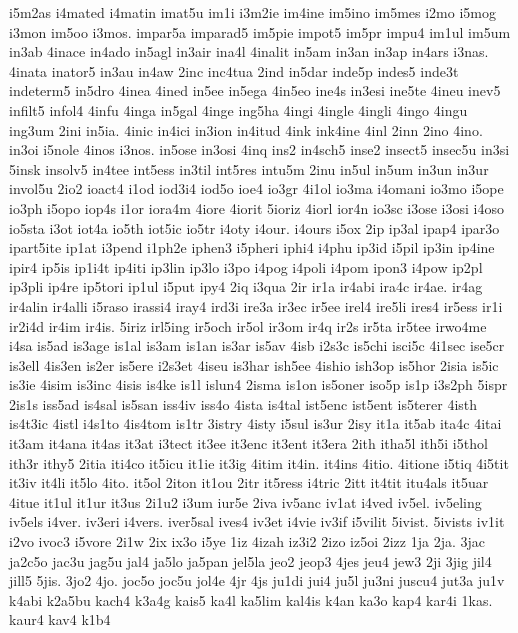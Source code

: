 {i5m2as
i4mated
i4matin
imat5u
im1i
i3m2ie
im4ine
im5ino
im5mes
i2mo
i5mog
i3mon
im5oo
i3mos.
impar5a
imparad5
im5pie
impot5
im5pr
impu4
im1ul
im5um
in3ab
4inace
in4ado
in5agl
in3air
ina4l
4inalit
in5am
in3an
in3ap
in4ars
i3nas.
4inata
inator5
in3au
in4aw
2inc
inc4tua
2ind
in5dar
inde5p
indes5
inde3t
indeterm5
in5dro
4inea
4ined
in5ee
in5ega
4in5eo
ine4s
in3esi
ine5te
4ineu
inev5
infilt5
infol4
4infu
4inga
in5gal
4inge
ing5ha
4ingi
4ingle
4ingli
4ingo
4ingu
ing3um
2ini
in5ia.
4inic
in4ici
in3ion
in4itud
4ink
ink4ine
4inl
2inn
2ino
4ino.
in3oi
i5nole
4inos
i3nos.
in5ose
in3osi
4inq
ins2
in4sch5
inse2
insect5
insec5u
in3si
5insk
insolv5
in4tee
int5ess
in3til
int5res
intu5m
2inu
in5ul
in5um
in3un
in3ur
invol5u
2io2
ioact4
i1od
iod3i4
iod5o
ioe4
io3gr
4i1ol
io3ma
i4omani
io3mo
i5ope
io3ph
i5opo
iop4s
i1or
iora4m
4iore
4iorit
5ioriz
4iorl
ior4n
io3sc
i3ose
i3osi
i4oso
io5sta
i3ot
iot4a
io5th
iot5ic
io5tr
i4oty
i4our.
i4ours
i5ox
2ip
ip3al
ipap4
ipar3o
ipart5ite
ip1at
i3pend
i1ph2e
iphen3
i5pheri
iphi4
i4phu
ip3id
i5pil
ip3in
ip4ine
ipir4
ip5is
ip1i4t
ip4iti
ip3lin
ip3lo
i3po
i4pog
i4poli
i4pom
ipon3
i4pow
ip2pl
ip3pli
ip4re
ip5tori
ip1ul
i5put
ipy4
2iq
i3qua
2ir
ir1a
ir4abi
ira4c
ir4ae.
ir4ag
ir4alin
ir4alli
i5raso
irassi4
iray4
ird3i
ire3a
ir3ec
ir5ee
irel4
ire5li
ires4
ir5ess
ir1i
ir2i4d
ir4im
ir4is.
5iriz
irl5ing
ir5och
ir5ol
ir3om
ir4q
ir2s
ir5ta
ir5tee
irwo4me
i4sa
is5ad
is3age
is1al
is3am
is1an
is3ar
is5av
4isb
i2s3c
is5chi
isci5c
4i1sec
ise5cr
is3ell
4is3en
is2er
is5ere
i2s3et
4iseu
is3har
ish5ee
4ishio
ish3op
is5hor
2isia
is5ic
is3ie
4isim
is3inc
4isis
is4ke
is1l
islun4
2isma
is1on
is5oner
iso5p
is1p
i3s2ph
5ispr
2is1s
iss5ad
is4sal
is5san
iss4iv
iss4o
4ista
is4tal
ist5enc
ist5ent
is5terer
4isth
is4t3ic
4istl
i4s1to
4is4tom
is1tr
3istry
4isty
i5sul
is3ur
2isy
it1a
it5ab
ita4c
4itai
it3am
it4ana
it4as
it3at
i3tect
it3ee
it3enc
it3ent
it3era
2ith
itha5l
ith5i
i5thol
ith3r
ithy5
2itia
iti4co
it5icu
it1ie
it3ig
4itim
it4in.
it4ins
4itio.
4itione
i5tiq
4i5tit
it3iv
it4li
it5lo
4ito.
it5ol
2iton
it1ou
2itr
it5ress
i4tric
2itt
it4tit
itu4als
it5uar
4itue
it1ul
it1ur
it3us
2i1u2
i3um
iur5e
2iva
iv5anc
iv1at
i4ved
iv5el.
iv5eling
iv5els
i4ver.
iv3eri
i4vers.
iver5sal
ives4
iv3et
i4vie
iv3if
i5vilit
5ivist.
5ivists
iv1it
i2vo
ivoc3
i5vore
2i1w
2ix
ix3o
i5ye
1iz
4izah
iz3i2
2izo
iz5oi
2izz
1ja
2ja.
3jac
ja2c5o
jac3u
jag5u
jal4
ja5lo
ja5pan
jel5la
jeo2
jeop3
4jes
jeu4
jew3
2ji
3jig
jil4
jill5
5jis.
3jo2
4jo.
joc5o
joc5u
jol4e
4jr
4js
ju1di
jui4
ju5l
ju3ni
juscu4
jut3a
ju1v
k4abi
k2a5bu
kach4
k3a4g
kais5
ka4l
ka5lim
kal4is
k4an
ka3o
kap4
kar4i
1kas.
kaur4
kav4
k1b4
}
